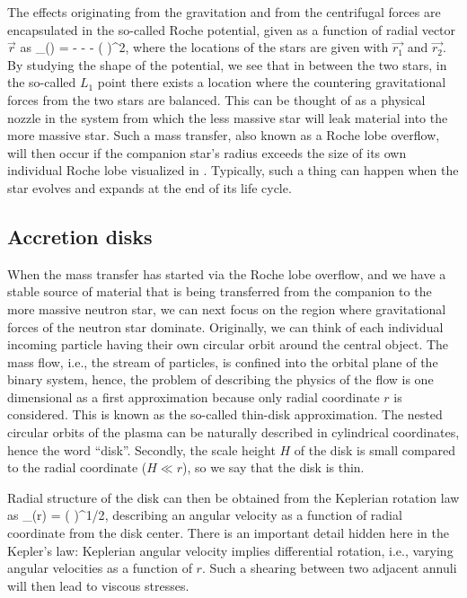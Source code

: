 The effects originating from the gravitation and from the centrifugal forces are encapsulated in the so-called Roche potential, given as a function of radial vector $\vec{r}$ as\cite[see e.g.,][]{PRP02, LL15}
\be
\Phi_{}() = - - -  ( \vec{ \omega } \times {} )^2,
\ee
where the locations of the stars are given with $\vec{r_1}$ and $\vec{r_2}$.
By studying the shape of the potential, we see that in between the two stars, in the so-called $L_1$ point there exists a location where the countering gravitational forces from the two stars are balanced.
This can be thought of as a physical nozzle in the system from which the less massive star will leak material into the more massive star.
Such a mass transfer, also known as a Roche lobe overflow, will then occur if the companion star's radius exceeds the size of its own individual Roche lobe visualized in .
Typically, such a thing can happen when the star evolves and expands at the end of its life cycle. 


\subsection{Accretion disks}

When the mass transfer has started via the Roche lobe overflow, and we have a stable source of material that is being transferred from the companion to the more massive neutron star, we can next focus on the region where gravitational forces of the neutron star dominate.
Originally, we can think of each individual incoming particle having their own circular orbit around the central object.
The mass flow, i.e., the stream of particles, is confined into the orbital plane of the binary system, hence, the problem of describing the physics of the flow is one dimensional as a first approximation because only radial coordinate $r$ is considered.
This is known as the so-called thin-disk approximation.
The nested circular orbits of the plasma can be naturally described in cylindrical coordinates, hence the word ``disk''.
Secondly, the scale height $H$ of the disk is small compared to the radial coordinate ($H \ll r$), so we say that the disk is thin.

Radial structure of the disk can then be obtained from the Keplerian rotation law as
\be
\Omega_{}(r) = \left(  \right)^{1/2},
\ee
describing an angular velocity as a function of radial coordinate from the disk center.
There is an important detail hidden here in the Kepler's law:
Keplerian angular velocity implies differential rotation, i.e., varying angular velocities as a function of $r$.
Such a shearing between two adjacent annuli will then lead to viscous stresses. %

